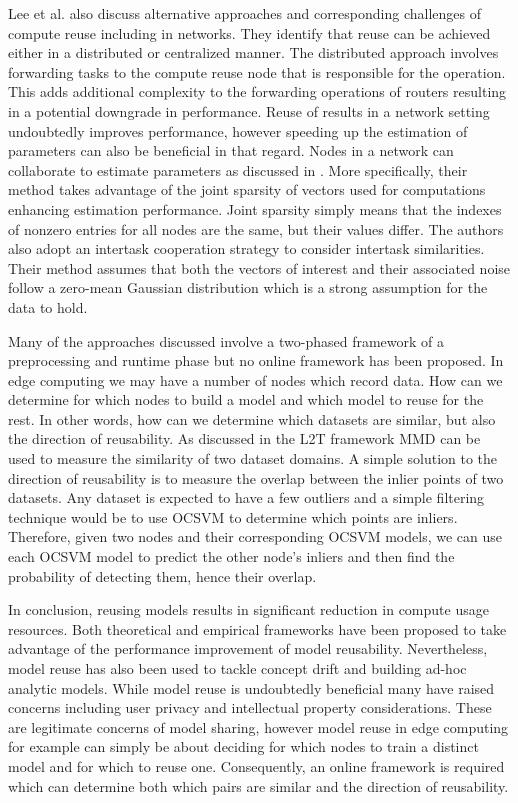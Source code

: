 \documentclass{mpaper}
\begin{document}
Lee et al. \cite{ComputeReuse} also discuss alternative approaches and corresponding challenges of compute reuse including in networks. They identify that reuse can be achieved either in a distributed or centralized manner. The distributed approach involves forwarding tasks to the compute reuse node that is responsible for the operation. This adds additional complexity to the forwarding operations of routers resulting in a potential downgrade in performance. Reuse of results in a network setting undoubtedly improves performance, however speeding up the estimation of parameters can also be beneficial in that regard. Nodes in a network can collaborate to estimate parameters as discussed in \cite{DistributedEstimation}. More specifically, their method takes advantage of the joint sparsity of vectors used for computations enhancing estimation performance. Joint sparsity simply means that the indexes of nonzero entries for all nodes are the same, but their values differ.  The authors also adopt an intertask cooperation strategy to consider intertask similarities. Their method assumes that both the vectors of interest and their associated noise follow a zero-mean Gaussian distribution which is a strong assumption for the data to hold. 

Many of the approaches discussed involve a two-phased framework of a preprocessing and runtime phase but no online framework has been proposed. In edge computing we may have a number of nodes which record data. How can we determine for which nodes to build a model and which model to reuse for the rest. In other words, how can we determine which datasets are similar, but also the direction of reusability. As discussed in the L2T \cite{L2T} framework MMD can be used to measure the similarity of two dataset domains. A simple solution to the direction of reusability is to measure the overlap between the inlier points of two datasets. Any dataset is expected to have a few outliers and a simple filtering technique would be to use OCSVM \cite{OriginalOCSVM} to determine which points are inliers. Therefore, given two nodes and their corresponding OCSVM models, we can use each OCSVM model to predict the other node's inliers and then find the probability of detecting them, hence their overlap. 

In conclusion, reusing models results in significant reduction in compute usage resources. Both theoretical and empirical frameworks have been proposed to take advantage of the performance improvement of model reusability. Nevertheless, model reuse has also been used to tackle concept drift and building ad-hoc analytic models. While model reuse is undoubtedly beneficial many have raised concerns including user privacy and intellectual property considerations. These are legitimate concerns of model sharing, however model reuse in edge computing for example can simply be about deciding for which nodes to train a distinct model and for which to reuse one. Consequently, an online framework is required which can determine both which pairs are similar and the direction of reusability. 
\end{document}
